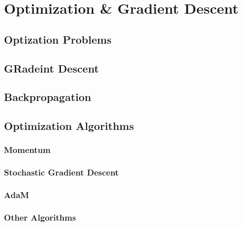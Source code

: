 \setchapterpreamble[u]{\margintoc}
\chapter{Optimization \& Gradient Descent}

\section{Optization Problems}
\section{GRadeint Descent}

\section{Backpropagation}

\section{Optimization Algorithms}
\subsection{Momentum}
\subsection{Stochastic Gradient Descent}
\subsection{AdaM}
\subsection{Other Algorithms}
